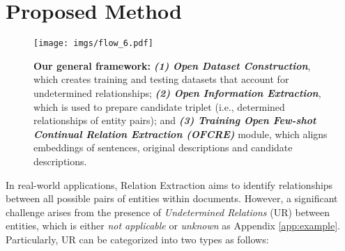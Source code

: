 \section{Proposed Method}


\begin{figure*}[t]
    \centering
    \texttt{[image: imgs/flow\_6.pdf]}
    \caption{\textbf{{Our general framework:}} \textbf{\textit{(1) Open Dataset Construction}}, which creates training and testing datasets that account for undetermined relationships; \textbf{\textit{(2) Open Information Extraction}}, which is used to prepare candidate triplet (i.e., determined relationships of entity pairs); and  \textbf{\textit{(3) Training Open Few-shot Continual Relation Extraction (OFCRE)}} module, which aligns embeddings of sentences, original descriptions and candidate descriptions.}
    \label{fig:overview}
\end{figure*}






In real-world applications, Relation Extraction aims to identify relationships between all possible pairs of entities within documents. However, a significant challenge arises from the presence of \textit{Undetermined Relations} (UR) between entities, which is either \textit{not applicable} or \textit{unknown} as Appendix \ref{app:example}. Particularly, UR can be categorized into two types as follows:


